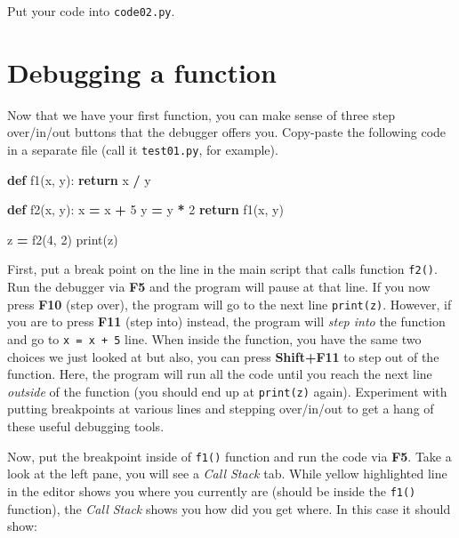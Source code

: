 \documentclass[
]{book}
\newenvironment{Shaded}{\begin{snugshade}}{\end{snugshade}}
\newcommand{\BuiltInTok}[1]{#1}
\newcommand{\ControlFlowTok}[1]{\textcolor[rgb]{0.13,0.29,0.53}{\textbf{#1}}}
\newcommand{\DecValTok}[1]{\textcolor[rgb]{0.00,0.00,0.81}{#1}}
\newcommand{\KeywordTok}[1]{\textcolor[rgb]{0.13,0.29,0.53}{\textbf{#1}}}
\newcommand{\NormalTok}[1]{#1}
\newcommand{\OperatorTok}[1]{\textcolor[rgb]{0.81,0.36,0.00}{\textbf{#1}}}
\begin{document}
Put your code into \texttt{code02.py}.

\hypertarget{debugging-a-function}{%
\section{Debugging a function}\label{debugging-a-function}}

Now that we have your first function, you can make sense of three step over/in/out buttons that the debugger offers you. Copy-paste the following code in a separate file (call it \texttt{test01.py}, for example).

\begin{Shaded}
\begin{Highlighting}[]
\KeywordTok{def}\NormalTok{ f1(x, y):}
  \ControlFlowTok{return}\NormalTok{ x }\OperatorTok{/}\NormalTok{ y}
  
\KeywordTok{def}\NormalTok{ f2(x, y):}
\NormalTok{  x }\OperatorTok{=}\NormalTok{ x }\OperatorTok{+} \DecValTok{5}
\NormalTok{  y }\OperatorTok{=}\NormalTok{ y }\OperatorTok{*} \DecValTok{2}
  \ControlFlowTok{return}\NormalTok{ f1(x, y)}
  
\NormalTok{z }\OperatorTok{=}\NormalTok{ f2(}\DecValTok{4}\NormalTok{, }\DecValTok{2}\NormalTok{)}
\BuiltInTok{print}\NormalTok{(z)}
\end{Highlighting}
\end{Shaded}

First, put a break point on the line in the main script that calls function \texttt{f2()}. Run the debugger via \textbf{F5} and the program will pause at that line. If you now press \textbf{F10} (step over), the program will go to the next line \texttt{print(z)}. However, if you are to press \textbf{F11} (step into) instead, the program will \emph{step into} the function and go to \texttt{x\ =\ x\ +\ 5} line. When inside the function, you have the same two choices we just looked at but also, you can press \textbf{Shift+F11} to step out of the function. Here, the program will run all the code until you reach the next line \emph{outside} of the function (you should end up at \texttt{print(z)} again). Experiment with putting breakpoints at various lines and stepping over/in/out to get a hang of these useful debugging tools.

Now, put the breakpoint inside of \texttt{f1()} function and run the code via \textbf{F5}. Take a look at the left pane, you will see a \emph{Call Stack} tab. While yellow highlighted line in the editor shows you where you currently are (should be inside the \texttt{f1()} function), the \emph{Call Stack} shows you how did you get where. In this case it should show:
\end{document}
